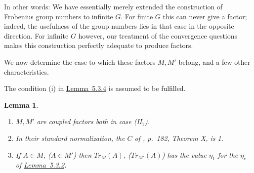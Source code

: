 \documentclass[b5paper,twoside]{article}
\newcommand{\lemref}[2]{\hyperref[#1]{\mbox{Lemma~#2}}}
\theoremstyle{mvnplain}
\newtheorem{lemma}{Lemma}[section]
\newcommand{\M}{\mathbf M}
\def\M{M}%
\def\operatorname#1{#1}%
\def\mathfrak#1{#1}%
\begin{document}
In other words: We have essentially merely extended the construction of
Frobenius group numbers to infinite \(\mathfrak G\). For finite
\(\mathfrak G\) this can never give a factor; indeed, the usefulness of the
group numbers lies in that case in the opposite direction. For infinite
\(\mathfrak G\) however, our treatment of the convergence questions makes
this construction perfectly adequate to produce factors.

We now determine the case to which these factors \(\M,\M'\) belong, and a few
other characteristics.

The condition (i) in \lemref{lem:5.3.4}{5.3.4} is assumed to be fulfilled.

\begin{lemma}\label{lem:5.3.5}
\begin{enumerate}[label=(\roman*)]
\item \(\M,\M'\) are coupled factors both in case (II\(_1\)).
\item In their standard normalization, the \(C\) of
\cite{ref5}, p.~182, Theorem X, is 1.
\item If \(A\in\M\), (\(A\in\M'\)) then
\(\operatorname{Tr}_{\M}(A)\), (\(\operatorname{Tr}_{\M'}(A)\)) has the
value \(\eta_1\) for the \(\eta_c\) of \lemref{lem:5.3.2}{5.3.2}.
\end{enumerate}
\end{lemma}
\end{document}
